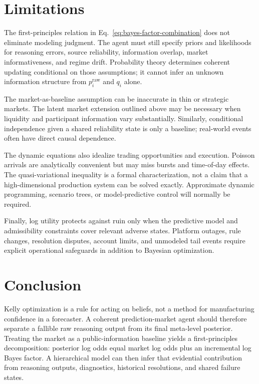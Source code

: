 \documentclass[journal,a4paper]{IEEEtran}
\begin{document}
\section{Limitations}
The first-principles relation in Eq.~\eqref{eq:bayes-factor-combination} does not eliminate modeling judgment. The agent must still specify priors and likelihoods for reasoning errors, source reliability, information overlap, market informativeness, and regime drift. Probability theory determines coherent updating conditional on those assumptions; it cannot infer an unknown information structure from $p_i^{\mathrm{raw}}$ and $q_i$ alone.

The market-as-baseline assumption can be inaccurate in thin or strategic markets. The latent market extension outlined above may be necessary when liquidity and participant information vary substantially. Similarly, conditional independence given a shared reliability state is only a baseline; real-world events often have direct causal dependence.

The dynamic equations also idealize trading opportunities and execution. Poisson arrivals are analytically convenient but may miss bursts and time-of-day effects. The quasi-variational inequality is a formal characterization, not a claim that a high-dimensional production system can be solved exactly. Approximate dynamic programming, scenario trees, or model-predictive control will normally be required.

Finally, log utility protects against ruin only when the predictive model and admissibility constraints cover relevant adverse states. Platform outages, rule changes, resolution disputes, account limits, and unmodeled tail events require explicit operational safeguards in addition to Bayesian optimization.

\section{Conclusion}
Kelly optimization is a rule for acting on beliefs, not a method for manufacturing confidence in a forecaster. A coherent prediction-market agent should therefore separate a fallible raw reasoning output from its final meta-level posterior. Treating the market as a public-information baseline yields a first-principles decomposition: posterior log odds equal market log odds plus an incremental log Bayes factor. A hierarchical model can then infer that evidential contribution from reasoning outputs, diagnostics, historical resolutions, and shared failure states.
\end{document}
